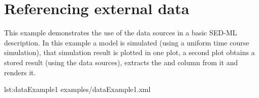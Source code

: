 \section{Referencing external data}
This example demonstrates the use of the data sources in a basic SED-ML description. In this example a model is simulated (using a uniform time course simulation), that simulation result is plotted in one plot, a second plot obtains a stored result (using the data sources), extracts the  and  column from it and renders it.


{lst:dataExample1}
{examples/dataExample1.xml}

